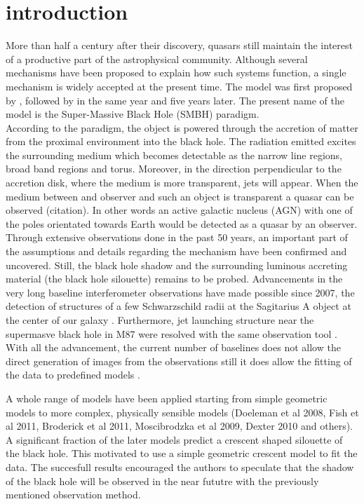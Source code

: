 \section{introduction}
More than half a century after their discovery, quasars still maintain the interest of a productive part of the astrophysical community. Although several mechanisms have been proposed 
to explain how such systems function, a single mechanism is widely accepted at the present time. The model was first proposed by \cite{1964ApJ...140..796S}, followed by \cite{1964SPhD....9..246Z} in the same year and \cite{1969Natur.223..690L} five years later. The present name of the model is the Super-Massive Black Hole (SMBH) paradigm.\\

According to the paradigm, the object is powered through the accretion of matter from the proximal environment into the black hole. The radiation emitted excites the surrounding medium which becomes detectable as the narrow line regions,
broad band regions and torus. Moreover, in the direction perpendicular to the accretion disk, where the medium is more transparent, jets will appear. When the medium between and observer and such an object is transparent a quasar can be observed (citation). In other words an active galactic nucleus (AGN) with one of the poles orientated towards Earth would be detected as a quasar by an observer. \\

Through extensive observations done in the past 50 years, an important part of the assumptions and details  regarding the mechanism have been confirmed and uncovered. Still, the black hole shadow and the surrounding luminous accreting material (the black hole silouette) remains to be probed. Advancements in the very long baseline interferometer observations have made possible since 2007, the detection of structures of a few Schwarzschild radii at the Sagitarius A object at the center of our galaxy \citep{2008JPhCS.131a2055D}. Furthermore, jet launching structure near the supermasve black hole in M87 were resolved with the same observation tool \citep{2012Sci...338..355D}. With all the advancement, the current number of baselines does not allow the direct generation of images from the observations still it does allow the fitting of the data to predefined models \citep{2013MNRAS.434..765K}.


A whole range of models have been applied starting from simple geometric models to more complex, physically sensible models (Doeleman et al 2008, Fish et al 2011, Broderick et al 2011, Moscibrodzka et al 2009, Dexter 2010 and others). A significant fraction of the later models predict a crescent shaped silouette of the black hole. This motivated \cite{2013MNRAS.434..765K} to use a simple geometric crescent model to fit the data. The succesfull results encouraged the authors to speculate that the shadow of the black hole will be observed in the near fututre with the previously mentioned observation method. \\


